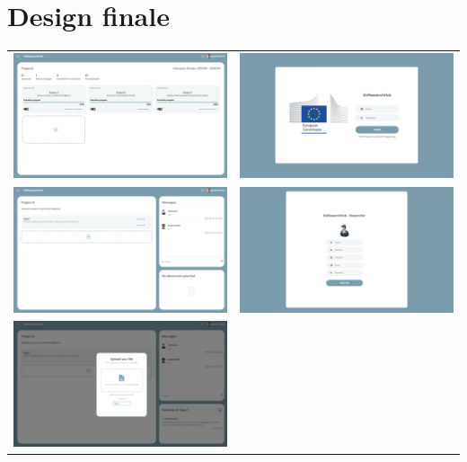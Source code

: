 \documentclass{report}
\begin{document}
\section{Design finale}
\begin{center}
\begin{longtable}{cc}

\includegraphics[width=8cm]{10.png} &
\includegraphics[width=8cm]{11.png} \\
\includegraphics[width=8cm]{12.png} &
\includegraphics[width=8cm]{13.png} \\
\includegraphics[width=8cm]{14.png} &

\end{longtable}
\end{center}
\end{document}
